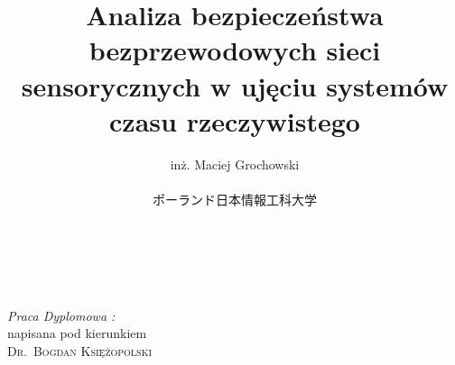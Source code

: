 \documentclass[11pt]{article}
\begin{document}
\begin{CJK*}{UTF8}{min}

\title{ Analiza bezpieczeństwa bezprzewodowych sieci sensorycznych w ujęciu systemów czasu rzeczywistego\\}
\author{inż. Maciej Grochowski \\
\\
ポーランド日本情報工科大学}
\maketitle 

\mbox{}\\
\mbox{}\\

\begin{flushright}
\emph{Praca Dyplomowa :} \\
napisana pod kierunkiem \\
 \textsc{ Dr.~Bogdan Księżopolski}
\end{flushright}







\clearpage 


	

	
	
		
		
		
	
	
	
	
	
	
	
	
	
	
	
	



\end{CJK*}	
\end{document}
